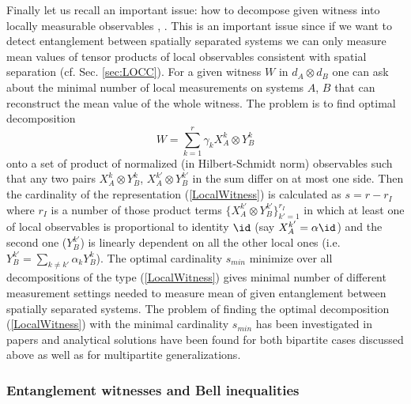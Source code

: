 \documentclass[twocolumn,aps,rmp]{revtex4}
\begin{document}
Finally let us recall an important issue: how to decompose given
witness into locally measurable observables
\cite{GuehneLocalMeasurementWitness}, \cite{GuehneHBE_s}. This is an
important issue since if we want to detect entanglement between
spatially separated systems we can only measure mean values of tensor
products of local observables consistent with spatial separation
(cf. Sec. \ref{sec:LOCC}). For a given witness $W$ in $d_{A}\otimes
d_{B}$ one can ask about the minimal number of local measurements on
systems $A$, $B$ that can reconstruct the mean value of the whole
witness. The problem is to find optimal decomposition
\begin{equation}
W=\sum_{k=1}^{r} \gamma_{k} X_{A}^{k} \otimes Y_{B}^{k}
\label{LocalWitness}
\end{equation}
onto a set of product of normalized (in Hilbert-Schmidt norm)
observables such that any two pairs $X_{A}^{k} \otimes Y_{B}^{k}$,
$X_{A}^{k'} \otimes Y_{B}^{k'}$ in the sum differ on at most one
side. Then the cardinality of the representation (\ref{LocalWitness})
is calculated as $s=r-r_{I}$ where $r_{I}$ is a number of those
product terms $\{ X_{A}^{k'} \otimes Y_{B}^{k'}\}_{k'=1}^{r_{I}}$ in
which at least one of local observables is proportional to identity
$\id$ (say $X_{A}^{k'}=\alpha \id$) and the second one ($Y_{B}^{k'}$)
is linearly dependent on all the other local ones (i.e. $
Y_{B}^{k'}=\sum_{k\neq k'} \alpha_k Y_{B}^{k}$). The optimal
cardinality $s_{min}$ minimize over all decompositions of the type
(\ref{LocalWitness}) gives minimal number of different measurement
settings needed to measure mean of given entanglement between
spatially separated systems. The problem of finding the optimal
decomposition (\ref{LocalWitness}) with the minimal cardinality
$s_{min}$ has been investigated in papers
\cite{GuehneLocalMeasurementWitness,GuehneHBE_s} and analytical
solutions have been found for both bipartite cases discussed above as
well as for multipartite generalizations.



\subsubsection { Entanglement witnesses and Bell inequalities}
\label{subsec:Bell_witness}
\end{document}
